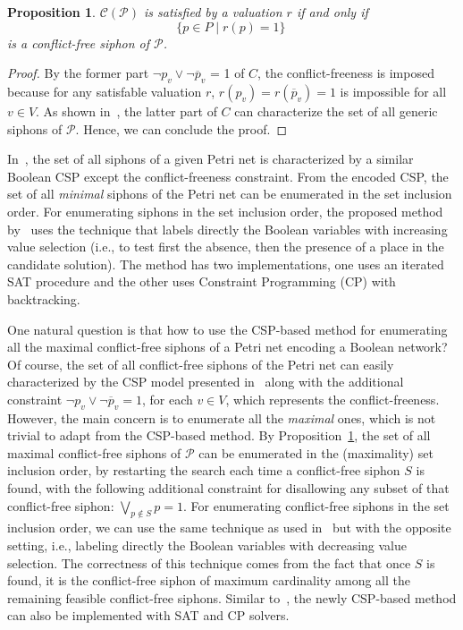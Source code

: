 \documentclass[preprint,12pt]{elsarticle}
\newtheorem{proposition}{Proposition}[section]
\begin{document}
\begin{proposition}%
\label{prop:csp_conflict_free_siphon}
  \(\mathcal{C}(\mathcal{P})\) is satisfied by a valuation \(r\) if and only if
  \[
    \{p \in P \;|\; r(p) = 1\}\
  \]
  is a conflict-free siphon of \(\mathcal{P}\).

\end{proposition}

\begin{proof}

  By the former part \(\neg p_v \vee \neg \overline{p}_v\) = 1 of \(C\), the conflict-freeness is imposed because for any satisfable valuation \(r\), \(r(p_v) = r(\overline{p}_v) = 1\) is impossible for all \(v \in V\).
  As shown in~\cite{nabli2016enumerating}, the latter part of \(C\) can characterize the set of all generic siphons of \(\mathcal{P}\).
  Hence, we can conclude the proof.

\end{proof}

In~\cite{nabli2016enumerating}, the set of all siphons of a given Petri net is characterized by a similar Boolean CSP except the conflict-freeness constraint.
From the encoded CSP, the set of all \emph{minimal} siphons of the Petri net can be enumerated in the set inclusion order.
For enumerating siphons in the set inclusion order, the proposed method by~\cite{nabli2016enumerating} uses the technique that labels directly the Boolean variables with increasing value selection (i.e., to test first the absence, then the presence of a place in the candidate solution).
The method has two implementations, one uses an iterated SAT procedure and the other uses Constraint Programming (CP) with backtracking.

One natural question is that how to use the CSP-based method for enumerating all the maximal conflict-free siphons of a Petri net encoding a Boolean network?
Of course, the set of all conflict-free siphons of the Petri net can easily characterized by the CSP model presented in~\cite{nabli2016enumerating} along with the additional constraint \(\neg p_v \vee \neg \overline{p}_v = 1\), for each \(v \in V\), which represents the conflict-freeness.
However, the main concern is to enumerate all the \emph{maximal} ones, which is not trivial to adapt from the CSP-based method.
By Proposition~\ref{prop:csp_conflict_free_siphon}, the set of all maximal conflict-free siphons of \(\mathcal{P}\) can be enumerated in the (maximality) set inclusion order, by restarting the search each time a conflict-free siphon \(S\) is found, with the following additional constraint for disallowing any subset of that conflict-free siphon: \(\bigvee_{p \not \in S} p = 1\).
For enumerating conflict-free siphons in the set inclusion order, we can use the same technique as used in~\cite{nabli2016enumerating} but with the opposite setting, i.e., labeling directly the Boolean variables with decreasing value selection.
The correctness of this technique comes from the fact that once \(S\) is found, it is the conflict-free siphon of maximum cardinality among all the remaining feasible conflict-free siphons.
Similar to~\cite{nabli2016enumerating}, the newly CSP-based method can also be implemented with SAT and CP solvers.
\end{document}
